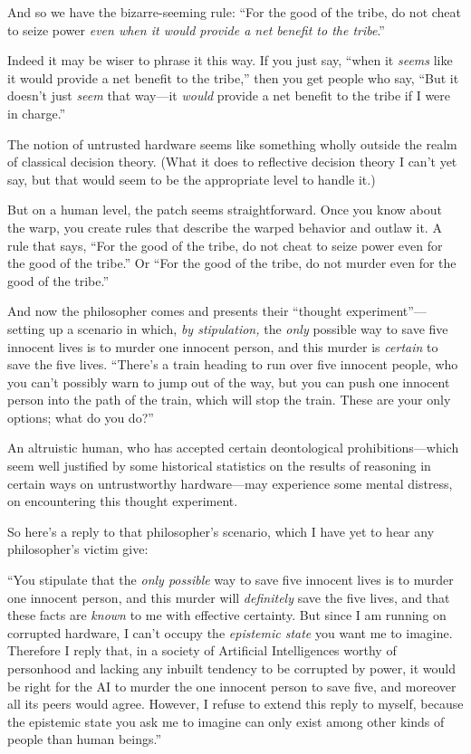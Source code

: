 {
 And so we have the bizarre-seeming rule: ``For
the good of the tribe, do not cheat to seize power \textit{even when it
would provide a net benefit to the tribe}.''}

{
 Indeed it may be wiser to phrase it this way. If you just say,
``when it \textit{seems} like it would provide a net
benefit to the tribe,'' then you get people who say,
``But it doesn't just \textit{seem}
that way---it \textit{would} provide a net benefit to the tribe if I
were in charge.''}

{
 The notion of untrusted hardware seems like something wholly
outside the realm of classical decision theory. (What it does to
reflective decision theory I can't yet say, but that
would seem to be the appropriate level to handle it.)}

{
 But on a human level, the patch seems straightforward. Once you
know about the warp, you create rules that describe the warped behavior
and outlaw it. A rule that says, ``For the good of the
tribe, do not cheat to seize power even for the good of the
tribe.'' Or ``For the good of the
tribe, do not murder even for the good of the
tribe.''}

{
 And now the philosopher comes and presents their
``thought experiment''---setting up
a scenario in which, \textit{by stipulation,} the \textit{only}
possible way to save five innocent lives is to murder one innocent
person, and this murder is \textit{certain} to save the five lives.
``There's a train heading to run over
five innocent people, who you can't possibly warn to
jump out of the way, but you can push one innocent person into the path
of the train, which will stop the train. These are your only options;
what do you do?''}

{
 An altruistic human, who has accepted certain deontological
prohibitions---which seem well justified by some historical statistics
on the results of reasoning in certain ways on untrustworthy
hardware---may experience some mental distress, on encountering this
thought experiment.}

{
 So here's a reply to that
philosopher's scenario, which I have yet to hear any
philosopher's victim give:}

{
 ``You stipulate that the \textit{only possible}
way to save five innocent lives is to murder one innocent person, and
this murder will \textit{definitely} save the five lives, and that
these facts are \textit{known} to me with effective certainty. But
since I am running on corrupted hardware, I can't
occupy the \textit{epistemic state} you want me to imagine. Therefore I
reply that, in a society of Artificial Intelligences worthy of
personhood and lacking any inbuilt tendency to be corrupted by power,
it would be right for the AI to murder the one innocent person to save
five, and moreover all its peers would agree. However, I refuse to
extend this reply to myself, because the epistemic state you ask me to
imagine can only exist among other kinds of people than human
beings.''}

